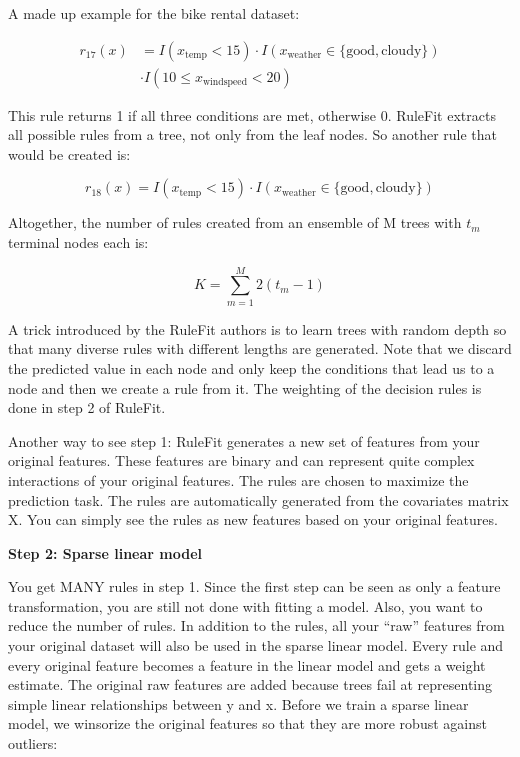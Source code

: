\documentclass[
  10pt,
]{scrbook}
\begin{document}
A made up example for the bike rental dataset:

\begin{align*}
r_{17}(x) & = I(x_{\text{temp}}<15) \cdot I(x_{\text{weather}}\in\{\text{good},\text{cloudy}\}) \\
            & \cdot I(10\leq x_{\text{windspeed}}<20) 
\end{align*}

This rule returns 1 if all three conditions are met, otherwise 0.
RuleFit extracts all possible rules from a tree, not only from the leaf nodes.
So another rule that would be created is:

\[r_{18}(x)=I(x_{\text{temp}}<15)\cdot I(x_{\text{weather}}\in\{\text{good},\text{cloudy}\})\]

Altogether, the number of rules created from an ensemble of M trees with \(t_m\) terminal nodes each is:

\[K=\sum_{m=1}^M2(t_m-1)\]

A trick introduced by the RuleFit authors is to learn trees with random depth so that many diverse rules with different lengths are generated.
Note that we discard the predicted value in each node and only keep the conditions that lead us to a node and then we create a rule from it.
The weighting of the decision rules is done in step 2 of RuleFit.

Another way to see step 1:
RuleFit generates a new set of features from your original features.
These features are binary and can represent quite complex interactions of your original features.
The rules are chosen to maximize the prediction task.
The rules are automatically generated from the covariates matrix X.
You can simply see the rules as new features based on your original features.

\textbf{Step 2: Sparse linear model}

You get MANY rules in step 1.
Since the first step can be seen as only a feature transformation, you are still not done with fitting a model.
Also, you want to reduce the number of rules.
In addition to the rules, all your ``raw'' features from your original dataset will also be used in the sparse linear model.
Every rule and every original feature becomes a feature in the linear model and gets a weight estimate.
The original raw features are added because trees fail at representing simple linear relationships between y and x.
Before we train a sparse linear model, we winsorize the original features so that they are more robust against outliers:
\end{document}
